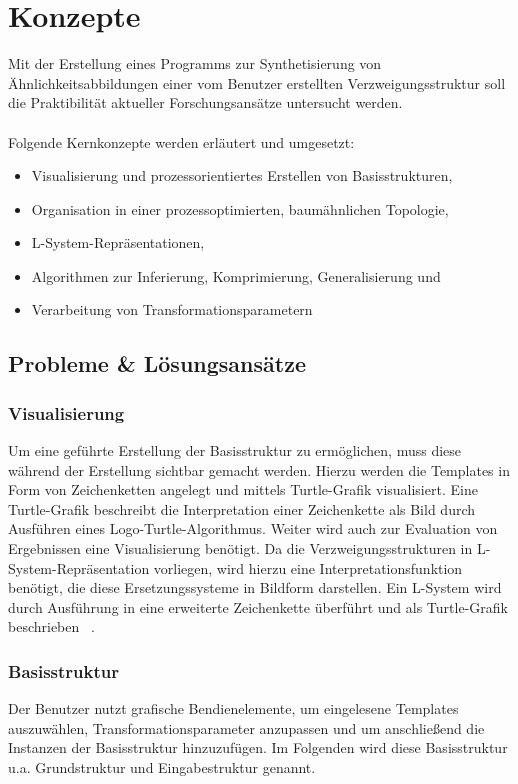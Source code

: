 
\chapter{Konzepte}
Mit der Erstellung eines Programms zur Synthetisierung von Ähnlichkeitsabbildungen einer vom Benutzer
erstellten Verzweigungsstruktur soll die Praktibilität aktueller Forschungsansätze untersucht werden.
\\~\\
Folgende Kernkonzepte werden erläutert und umgesetzt:
\begin{itemize}
    \item Visualisierung und prozessorientiertes Erstellen von Basisstrukturen,
    \item Organisation in einer prozessoptimierten, baumähnlichen Topologie,
    \item L-System-Repräsentationen,
    \item Algorithmen zur Inferierung, Komprimierung, Generalisierung und
    \item Verarbeitung von Transformationsparametern
\end{itemize}

\section{Probleme \& Lösungsansätze}
\label{probleme}

\subsection*{Visualisierung}
Um eine geführte Erstellung der Basisstruktur zu ermöglichen, muss diese während der Erstellung sichtbar gemacht werden.
Hierzu werden die Templates in Form von Zeichenketten angelegt und mittels Turtle-Grafik visualisiert.
Eine Turtle-Grafik beschreibt die Interpretation einer Zeichenkette als Bild durch Ausführen eines Logo-Turtle-Algorithmus.
Weiter wird auch zur Evaluation von Ergebnissen eine Visualisierung benötigt.
Da die Verzweigungsstrukturen in L-System-Repräsentation vorliegen, wird hierzu eine Interpretationsfunktion benötigt,
die diese Ersetzungssysteme in Bildform darstellen.
Ein L-System wird durch Ausführung in eine erweiterte Zeichenkette überführt und als Turtle-Grafik beschrieben
~\cite{prusinkiewicz_1986}.

\subsection*{Basisstruktur}
Der Benutzer nutzt grafische Bendienelemente, um eingelesene Templates auszuwählen, Transformationsparameter anzupassen
und um anschließend die Instanzen der Basisstruktur hinzuzufügen.
Im Folgenden wird diese Basisstruktur u.a. Grundstruktur und Eingabestruktur genannt.

